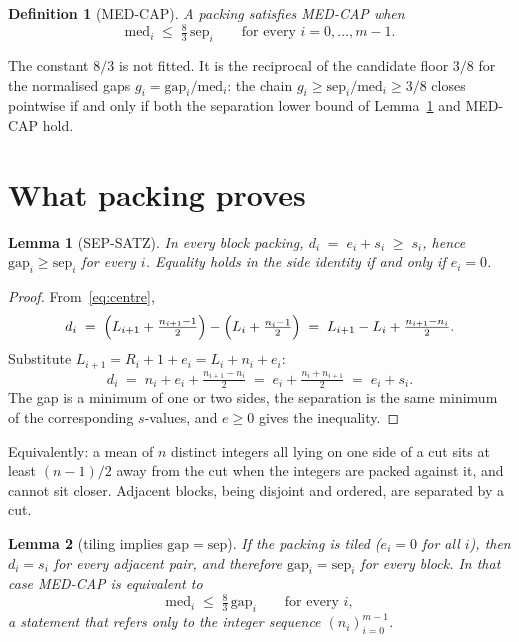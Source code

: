 \documentclass[11pt]{article}
\newtheorem{lemma}{Lemma}
\newtheorem{definition}{Definition}
\theoremstyle{remark}
\begin{document}
\begin{definition}[MED-CAP]
A packing satisfies \emph{MED-CAP} when
\begin{equation}\label{eq:medcap}
\mathrm{med}_i \;\le\; \tfrac83\,\mathrm{sep}_i
\qquad\text{for every }i=0,\dots,m-1.
\end{equation}
\end{definition}

The constant $8/3$ is not fitted.  It is the reciprocal of the
candidate floor $3/8$ for the normalised gaps
$g_i=\mathrm{gap}_i/\mathrm{med}_i$: the chain
$g_i\ge\mathrm{sep}_i/\mathrm{med}_i\ge 3/8$ closes pointwise if and
only if both the separation lower bound of Lemma~\ref{lem:sep} and
MED-CAP hold.

\section{What packing proves}

\begin{lemma}[SEP-SATZ]\label{lem:sep}
In every block packing,
$d_i \;=\; e_i + s_i \;\ge\; s_i$,
hence $\mathrm{gap}_i\ge\mathrm{sep}_i$ for every $i$.
Equality holds in the side identity if and only if $e_i=0$.
\end{lemma}

\begin{proof}
From~\eqref{eq:centre},
\[
d_i
 \;=\;
\Bigl(L_{i+1}+\tfrac{n_{i+1}-1}{2}\Bigr)
-\Bigl(L_i+\tfrac{n_i-1}{2}\Bigr)
 \;=\;
L_{i+1}-L_i+\tfrac{n_{i+1}-n_i}{2}.
\]
Substitute $L_{i+1}=R_i+1+e_i=L_i+n_i+e_i$:
\[
d_i
 \;=\;
n_i+e_i+\tfrac{n_{i+1}-n_i}{2}
 \;=\;
e_i+\tfrac{n_i+n_{i+1}}{2}
 \;=\;
e_i+s_i.
\]
The gap is a minimum of one or two sides, the separation is the
same minimum of the corresponding $s$-values, and $e\ge 0$ gives
the inequality.
\end{proof}

Equivalently: a mean of $n$ distinct integers all lying on one
side of a cut sits at least $(n-1)/2$ away from the cut when the
integers are packed against it, and cannot sit closer.  Adjacent
blocks, being disjoint and ordered, are separated by a cut.

\begin{lemma}[tiling implies $\mathrm{gap}=\mathrm{sep}$]\label{lem:tile-gap}
If the packing is tiled ($e_i=0$ for all $i$), then
$d_i=s_i$ for every adjacent pair, and therefore
$\mathrm{gap}_i=\mathrm{sep}_i$ for every block.  In that case
MED-CAP is equivalent to
\[
\mathrm{med}_i \;\le\; \tfrac83\,\mathrm{gap}_i
\qquad\text{for every }i,
\]
a statement that refers only to the integer sequence $(n_i)_{i=0}^{m-1}$.
\end{lemma}
\end{document}
